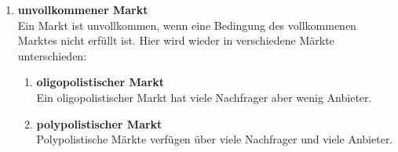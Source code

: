 \begin{flushleft}
\begin{enumerate}
{\begin{enumerate}
{\begin{enumerate}
                        \item Der Markt reagiert sofort
                        \item Marktteilnehmer sind rational
                    \end{enumerate}
                    Im vollkommenen Markt liegt ein Gleichgewichtspreis vor. Der Gleichgewichtspreis ist der Schnittpunkt zwischen der Angebots- und der Nachfragekurve.
                    Ein vollkommener Markt ist ein rein theoretisches Modell.
                }
                \item {
                    \textbf{unvollkommener Markt} \\
                    Ein Markt ist unvollkommen, wenn eine Bedingung des vollkommenen Marktes nicht erfüllt ist.
                    Hier wird wieder in verschiedene Märkte unterschieden:
                    \begin{enumerate}
                        \item {
                            \textbf{oligopolistischer Markt} \\
                            Ein oligopolistischer Markt hat viele Nachfrager aber wenig Anbieter.
                        }
                        \item {
                            \textbf{polypolistischer Markt} \\
                            Polypolistische Märkte verfügen über viele Nachfrager und viele Anbieter.
                        }
                    \end{enumerate}
                }
            \end{enumerate} 
        }
    \end{enumerate}
\end{flushleft}

